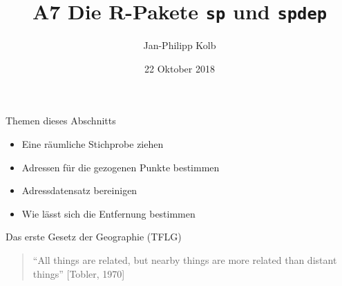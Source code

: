 \documentclass[ignorenonframetext,]{beamer}
\title{A7 Die R-Pakete \texttt{sp} und \texttt{spdep}}
\author{Jan-Philipp Kolb}
\date{22 Oktober 2018}
\providecommand{\tightlist}{%
  \setlength{\itemsep}{0pt}\setlength{\parskip}{0pt}}
\begin{document}
\frame{\titlepage}

\begin{frame}{Themen dieses Abschnitts}
\protect\hypertarget{themen-dieses-abschnitts}{}

\begin{itemize}
\tightlist
\item
  Eine räumliche Stichprobe ziehen
\item
  Adressen für die gezogenen Punkte bestimmen
\item
  Adressdatensatz bereinigen
\item
  Wie lässt sich die Entfernung bestimmen
\end{itemize}

\begin{block}{Das erste Gesetz der Geographie (TFLG)}

\begin{quote}
``All things are related, but nearby things are more related than
distant things'' {[}Tobler, 1970{]}
\end{quote}

\end{block}

\end{frame}
\end{document}
